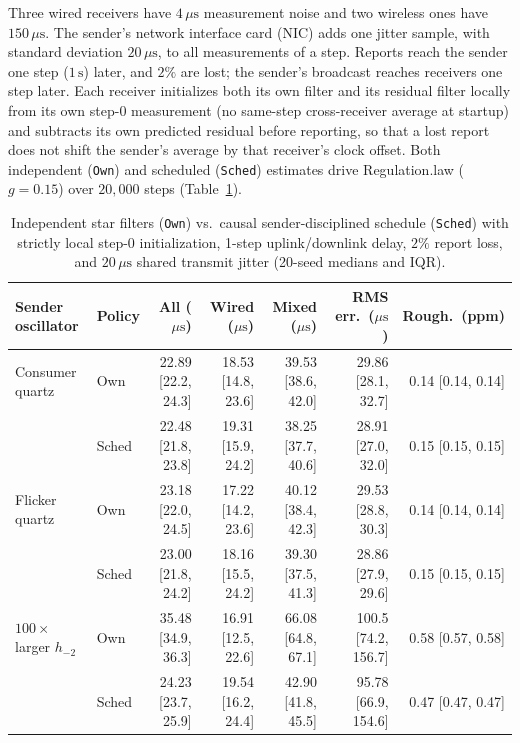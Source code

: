 \documentclass[11pt,a4paper]{article}
\DeclareRobustCommand{\lean}[1]{{\ttfamily\def\_{\textunderscore\allowbreak}#1}}
\theoremstyle{definition}
\begin{document}
Three wired receivers have $4\,\mu\text{s}$ measurement noise and two wireless
ones have $150\,\mu\text{s}$. The sender's network interface card (NIC) adds
one jitter sample, with standard deviation $20\,\mu\text{s}$, to all
measurements of a step. Reports reach the sender one step ($1\,\text{s}$)
later, and $2\%$ are lost; the sender's broadcast reaches receivers one step
later. Each receiver initializes both its own filter and its residual filter
locally from its own step-0 measurement (no same-step cross-receiver average at
startup) and subtracts its own predicted residual before reporting, so that a
lost report does not shift the sender's average by that receiver's clock
offset. Both independent (\texttt{Own}) and scheduled (\texttt{Sched})
estimates drive \lean{Regulation.law} ($g = 0.15$) over $20{,}000$ steps
(Table~\ref{tab:sched}).

\begin{table}[htb]
\centering
\footnotesize
\setlength{\tabcolsep}{2.4pt}
\begin{tabular}{@{}ll r r r r r@{}}
\toprule
Sender oscillator & Policy & All ($\mu\text{s}$) & Wired ($\mu\text{s}$) & Mixed ($\mu\text{s}$) & RMS err.\ ($\mu\text{s}$) & Rough.\ (ppm) \\
\midrule
Consumer quartz & Own   & 22.89 [22.2, 24.3] & 18.53 [14.8, 23.6] & 39.53 [38.6, 42.0] & 29.86 [28.1, 32.7] & 0.14 [0.14, 0.14] \\
                & Sched & 22.48 [21.8, 23.8] & 19.31 [15.9, 24.2] & 38.25 [37.7, 40.6] & 28.91 [27.0, 32.0] & 0.15 [0.15, 0.15] \\
\midrule
Flicker quartz  & Own   & 23.18 [22.0, 24.5] & 17.22 [14.2, 23.6] & 40.12 [38.4, 42.3] & 29.53 [28.8, 30.3] & 0.14 [0.14, 0.14] \\
                & Sched & 23.00 [21.8, 24.2] & 18.16 [15.5, 24.2] & 39.30 [37.5, 41.3] & 28.86 [27.9, 29.6] & 0.15 [0.15, 0.15] \\
\midrule
$100\times$ larger $h_{-2}$ & Own & 35.48 [34.9, 36.3] & 16.91 [12.5, 22.6] & 66.08 [64.8, 67.1] & 100.5 [74.2, 156.7] & 0.58 [0.57, 0.58] \\
                & Sched & 24.23 [23.7, 25.9] & 19.54 [16.2, 24.4] & 42.90 [41.8, 45.5] & 95.78 [66.9, 154.6] & 0.47 [0.47, 0.47] \\
\bottomrule
\end{tabular}
\caption{Independent star filters (\texttt{Own}) vs.\ causal sender-disciplined
schedule (\texttt{Sched}) with strictly local step-0 initialization, 1-step
uplink/downlink delay, $2\%$ report loss, and $20\,\mu\text{s}$ shared transmit
jitter (20-seed medians and IQR).}
\label{tab:sched}
\end{table}
\end{document}
